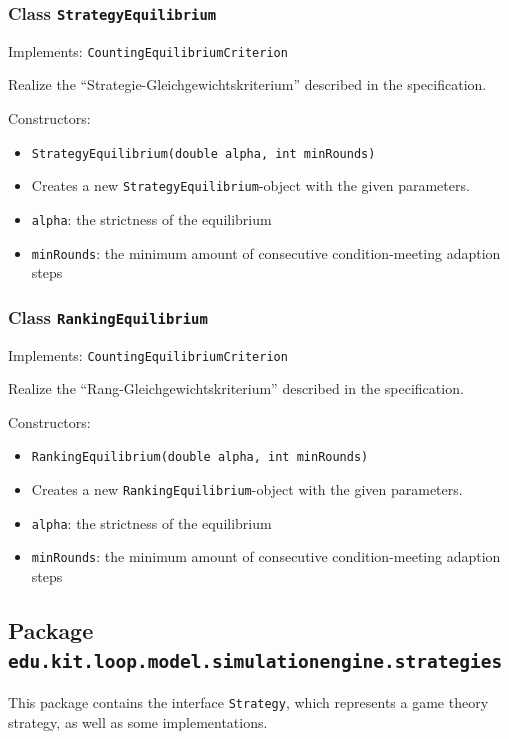 \documentclass[parskip=full,11pt]{scrartcl}
\begin{document}
\subsubsection{Class \texttt{StrategyEquilibrium}}
Implements: \texttt{CountingEquilibriumCriterion}

Realize the \enquote{Strategie-Gleichgewichtskriterium} described in the specification.

Constructors:
\begin{itemize}\itemsep -10pt
\item \texttt{StrategyEquilibrium(double alpha, int minRounds)}
\item[] Creates a new \texttt{StrategyEquilibrium}-object with the given parameters.
\item[] \texttt{alpha}: the strictness of the equilibrium
\item[] \texttt{minRounds}: the minimum amount of consecutive condition-meeting adaption steps
\end{itemize}

\subsubsection{Class \texttt{RankingEquilibrium}}
Implements: \texttt{CountingEquilibriumCriterion}

Realize the \enquote{Rang-Gleichgewichtskriterium} described in the specification.

Constructors:
\begin{itemize}\itemsep -10pt
\item \texttt{RankingEquilibrium(double alpha, int minRounds)}
\item[] Creates a new \texttt{RankingEquilibrium}-object with the given parameters.
\item[] \texttt{alpha}: the strictness of the equilibrium
\item[] \texttt{minRounds}: the minimum amount of consecutive condition-meeting adaption steps
\end{itemize}

\subsection{Package \texttt{edu.kit.loop.model.simulationengine.strategies}}
This package contains the interface \texttt{Strategy}, which represents a game theory strategy, as well as some implementations.

\end{document}
